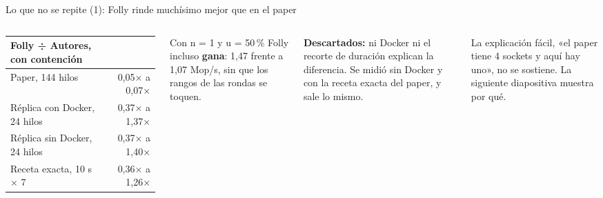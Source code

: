 \begin{frame}{Lo que no se repite (1): Folly rinde muchísimo mejor que en el paper}
  \begin{columns}[T,onlytextwidth]
    \footnotesize
    \begin{tabular}{@{}p{40mm}r@{}}
      \toprule
      \textbf{Folly ÷ Autores, con contención} & \\
      \midrule
      Paper, 144 hilos & 0,05× a 0,07×\\
      Réplica con Docker, 24 hilos & 0,37× a 1,37×\\
      Réplica sin Docker, 24 hilos & 0,37× a 1,40×\\
      Receta exacta, 10 s × 7 & 0,36× a 1,26×\\
      \bottomrule
    \end{tabular}\par\vspace{2mm}
    Con n = 1 y u = 50\,\% Folly incluso \textbf{gana}: 1,47 frente a 1,07 Mop/s, sin que los rangos de las rondas se toquen.
    \begin{idea}\footnotesize\textbf{Descartados:} ni Docker ni el recorte de duración explican la diferencia. Se midió sin Docker y con la receta exacta del paper, y sale lo mismo.\end{idea}
    \begin{ojo}La explicación fácil, «el paper tiene 4 sockets y aquí hay uno», no se sostiene. La siguiente diapositiva muestra por qué.\end{ojo}
  \end{columns}
\end{frame}

